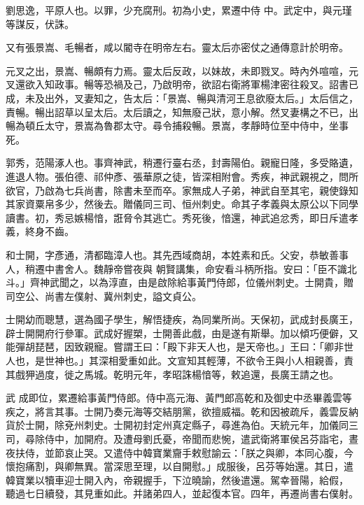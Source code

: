 \begin{pinyinscope}
 劉思逸，平原人也。以罪，少充腐刑。初為小史，累遷中侍
 中。武定中，與元瑾等謀反，伏誅。



 又有張景嵩、毛暢者，咸以閽寺在明帝左右。靈太后亦密仗之通傳意計於明帝。



 元叉之出，景嵩、暢頗有力焉。靈太后反政，以妹故，未即戮叉。時內外喧喧，元叉還欲入知政事。暢等恐禍及己，乃啟明帝，欲詔右衛將軍楊津密往殺叉。詔書已成，未及出外，叉妻知之，告太后：「景嵩、暢與清河王息欲廢太后。」太后信之，責暢。暢出詔草以呈太后。太后讀之，知無廢己狀，意小解。然叉妻構之不已，出暢為頓丘太守，景嵩為魯郡太守。尋令捕殺暢。景嵩，孝靜時位至中侍中，坐事死。



 郭秀，范陽涿人也。事齊神武，稍遷行臺右丞，封壽陽伯。親寵日隆，多受賂遺，進退人物。張伯德、祁仲彥、張華原之徒，皆深相附會。秀疾，神武親視之，問所欲官，乃啟為七兵尚書，除書未至而卒。家無成人子弟，神武自至其宅，親使錄知其家資粟帛多少，然後去。贈儀同三司、恒州刺史。命其子孝義與太原公以下同學讀書。初，秀忌嫉楊愔，誑脅令其逃亡。秀死後，愔還，神武追忿秀，即日斥遣孝義，終身不齒。



 和士開，字彥通，清都臨漳人也。其先西域商胡，本姓素和氏。父安，恭敏善事人，稍遷中書舍人。魏靜帝嘗夜與
 朝賢講集，命安看斗柄所指。安曰：「臣不識北斗。」齊神武聞之，以為淳直，由是啟除給事黃門侍郎，位儀州刺史。士開貴，贈司空公、尚書左僕射、冀州刺史，謚文貞公。



 士開幼而聰慧，選為國子學生，解悟捷疾，為同業所尚。天保初，武成封長廣王，辟士開開府行參軍。武成好握槊，士開善此戲，由是遂有斯舉。加以傾巧便僻，又能彈胡琵琶，因致親寵。嘗謂王曰：「殿下非天人也，是天帝也。」王曰：「卿非世人也，是世神也。」其深相愛重如此。文宣知其輕薄，不欲令王與小人相親善，責其戲狎過度，徙之馬城。乾明元年，孝昭誅楊愔等，敕追還，長廣王請之也。



 武
 成即位，累遷給事黃門侍郎。侍中高元海、黃門郎高乾和及御史中丞畢義雲等疾之，將言其事。士開乃奏元海等交結朋黨，欲擅威福。乾和因被疏斥，義雲反納貨於士開，除兗州刺史。士開初封定州真定縣子，尋進為伯。天統元年，加儀同三司，尋除侍中，加開府。及遭母劉氏憂，帝聞而悲惋，遣武衛將軍侯呂芬詣宅，晝夜扶侍，並節哀止哭。又遣侍中韓寶業齎手敕慰諭云：「朕之與卿，本同心腹，今懷抱痛割，與卿無異。當深思至理，以自開慰。」成服後，呂芬等始還。其日，遣韓寶業以犢車迎士開入內，帝親握手，下泣曉諭，然後遣還。駕幸晉陽，給假，
 聽過七日續發，其見重如此。并諸弟四人，並起復本官。四年，再遷尚書右僕射。




\end{pinyinscope}
